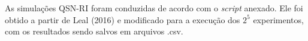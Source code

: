 
As simulações QSN-RI foram conduzidas de acordo com o \textit{script} anexado. Ele foi obtido a partir de Leal (2016) e modificado para a execução dos $2^5$ experimentos, com os resultados sendo salvos em arquivos .csv.












